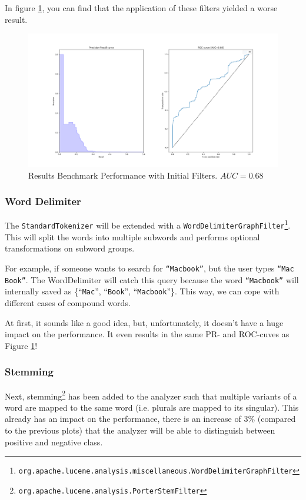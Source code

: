 \documentclass[11pt]{article}
\begin{document}
In figure \ref{fig:alphanumeric}, you can find that the application of these filters yielded a worse result.
\begin{figure}[h!]
    \centering
    \includegraphics[width=\textwidth]{images/customAna-trim}
    \caption{Results Benchmark Performance with Initial Filters. $AUC = 0.68$}
    \label{fig:alphanumeric}
\end{figure}

\subsubsection{Word Delimiter}\label{sec:word-delimiter}
The \texttt{StandardTokenizer} will be extended with a \texttt{WordDelimiterGraphFilter}\footnote{\texttt{org.apache.lucene.analysis.miscellaneous.WordDelimiterGraphFilter}}. This will split the words into multiple subwords and performs optional transformations on subword groups. \cite{lucene}

For example, if someone wants to search for \texttt{``Macbook''}, but the user types \texttt{``Mac Book''}. The WordDelimiter will catch this query because the word \texttt{``Macbook''} will internally saved as \{``\texttt{Mac}'', ``\texttt{Book}'', ``\texttt{Macbook}''\}. This way, we can cope with different cases of compound words.

At first, it sounds like a good idea, but, unfortunately, it doesn't have a huge impact on the performance. It even results in the same PR- and ROC-cuves as Figure \ref{fig:alphanumeric}!

\subsubsection{Stemming}\label{sec:stemming}
Next, stemming\footnote{\texttt{org.apache.lucene.analysis.PorterStemFilter}} has been added to the analyzer such that multiple variants of a word are mapped to the same word (i.e. plurals are mapped to its singular). This already has an impact on the performance, there is an increase of 3\% (compared to the previous plots) that the analyzer will be able to distinguish between positive and negative class.
\end{document}
